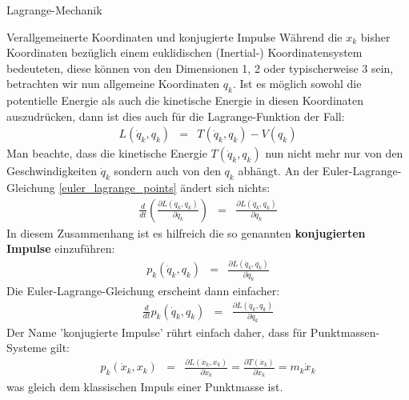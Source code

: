 \begin{chapter}{\titlestr}
\begin{section}{Lagrange-Mechanik}
\begin{subsection}{Verallgemeinerte Koordinaten und konjugierte Impulse}
Während die $x_k$ bisher Koordinaten bezüglich einem euklidischen (Inertial-) Koordinatensystem bedeuteten, diese können von den Dimensionen 1, 2 oder typischerweise 3 sein, betrachten wir nun allgemeine Koordinaten $q_k$. Ist es möglich sowohl
die potentielle Energie als auch die kinetische Energie in diesen Koordinaten auszudrücken, dann ist dies auch für die Lagrange-Funktion der Fall:
\begin{eqnarray*}
L(\dot{q}_k,q_k) &=& T(\dot{q}_k,q_k)-V(q_k)
\end{eqnarray*}
Man beachte, dass die kinetische Energie $T(\dot{q}_k,q_k)$ nun nicht mehr nur von den Geschwindigkeiten $\dot{q}_k$ sondern auch von den $q_k$ abhängt.
An der Euler-Lagrange-Gleichung \ref{euler_lagrange_points} ändert sich nichts:
\begin{eqnarray}
\label{euler_lagrange_gencoords}
\frac{d}{dt}\left(\frac{\partial L(\dot{q}_k,q_k)}{\partial \dot{q}_k}\right) &=& \frac{\partial L(\dot{q}_k, q_k)}{\partial q_k}
\end{eqnarray}
In diesem Zusammenhang ist es hilfreich die so genannten \textbf{konjugierten Impulse} einzuführen:
\begin{eqnarray*}
p_k (\dot{q}_k,q_k) &=& \frac{\partial L(\dot{q}_k,q_k)}{\partial \dot{q}_k}
\end{eqnarray*}
Die Euler-Lagrange-Gleichung erscheint dann einfacher:
\begin{eqnarray*}
\frac{d}{dt}p_k (\dot{q}_k,q_k) &=& \frac{\partial L(\dot{q}_k, q_k)}{\partial q_k}
\end{eqnarray*}
Der Name 'konjugierte Impulse' rührt einfach daher, dass für Punktmassen-Systeme gilt:
\begin{eqnarray*}
p_k (\dot{x}_k,x_k) &=& \frac{\partial L(\dot{x}_k,x_k)}{\partial \dot{x}_k}
=\frac{\partial T(\dot{x}_k)}{\partial \dot{x}_k}=m_k\dot{x}_k
\end{eqnarray*}
was gleich dem klassischen Impuls einer Punktmasse ist.
\end{subsection}
\end{section}


\end{chapter}
